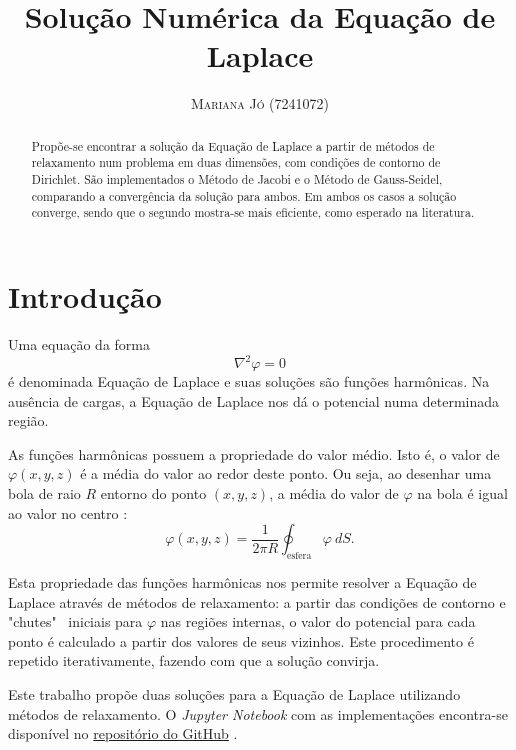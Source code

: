 \documentclass[a4paper,12pt]{article}
\title{\vspace{-18mm}\fontsize{18pt}{20pt}\selectfont\textbf{
                    Solução Numérica da Equação de Laplace}} %
\author{
\large
\textsc{Mariana Jó (7241072)}\\
\vspace{-20pt}
}
\date{}
\begin{document}
\maketitle
\thispagestyle{fancy}

\begin{abstract}
  Propõe-se encontrar a solução da Equação de Laplace a partir de métodos de relaxamento num problema em duas dimensões, com condições de contorno de Dirichlet. São implementados o Método de Jacobi e o Método de Gauss-Seidel, comparando a convergência da solução para ambos. Em ambos os casos a solução converge, sendo que o segundo mostra-se mais eficiente, como esperado na literatura.
\end{abstract}

\section{Introdução}

Uma equação da forma
\begin{equation}
\nabla^2 \varphi = 0
\label{eq:laplace}
\end{equation}
é denominada Equação de Laplace e suas soluções são funções harmônicas. Na ausência de cargas, a Equação de Laplace nos dá o potencial numa determinada região.

As funções harmônicas possuem a propriedade do valor médio. Isto é, o valor de $\varphi (x, y, z)$ é a média
do valor ao redor deste ponto. Ou seja, ao desenhar uma bola de raio $R$ entorno do
ponto $(x, y, z)$, a média do valor de $\varphi$ na bola é igual ao valor no centro \cite{griffithsd.j1999}:
\begin{equation*}
  \varphi(x, y, z) = \frac{1}{2\pi R}\oint_{\text{esfera}}\varphi \ dS.
\end{equation*}

Esta propriedade das funções harmônicas nos permite resolver a Equação de Laplace
através de métodos de relaxamento: a partir das condições de contorno e "chutes" \ iniciais para $\varphi$ nas regiões internas, o valor do potencial para
cada ponto é calculado a partir dos valores de seus vizinhos. Este procedimento é
repetido iterativamente, fazendo com que a solução convirja.

Este trabalho propõe duas soluções para a Equação de Laplace utilizando métodos de relaxamento. O \textit{Jupyter Notebook} com as implementações encontra-se disponível no \href{https://github.com/marianajo/laplaces-equation/blob/code/code/LaplacesEquation.pdf}{repositório do GitHub} \cite{github}.
\end{document}
